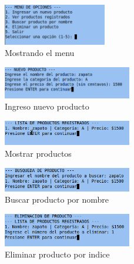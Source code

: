 \documentclass[12pt]{article}
\begin{document}
\begin{figure}[H]
	\centering
	\setlength{\fboxrule}{0pt}
	\includegraphics[width=0.4\textwidth]{img1.png}
	\caption{Mostrando el menu}
	\label{fig:menu}
\end{figure} 

\begin{figure}[H]
	\centering
	\setlength{\fboxrule}{0pt}
	\includegraphics[width=0.5\textwidth]{img2.png}
	\caption{Ingreso nuevo producto}
	\label{fig:nuevo producto}
\end{figure} 

\begin{figure}[H]
	\centering
	\setlength{\fboxrule}{0pt}
	\includegraphics[width=0.5\textwidth]{img3.png}
	\caption{Mostrar productos}
	\label{fig:mostras productos}
\end{figure} 

\begin{figure}[H]
	\centering
	\setlength{\fboxrule}{0pt}
	\includegraphics[width=0.5\textwidth]{img4.png}
	\caption{Buscar producto por nombre}
	\label{fig:buscar producto}
\end{figure} 

\begin{figure}[H]
	\centering
	\setlength{\fboxrule}{0pt}
	\includegraphics[width=0.5\textwidth]{img5.png}
	\caption{Eliminar producto por indice}
	\label{fig:eliminar producto}
\end{figure} 
\end{document}

